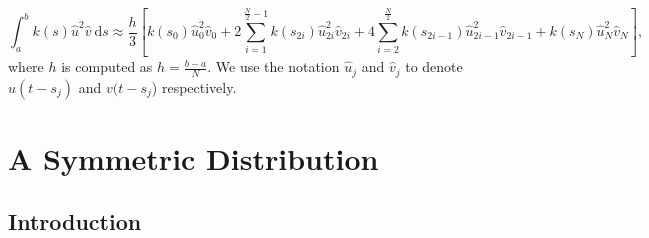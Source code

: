 \begin{equation}\label{simp}\int_{a}^{b}k(s)\hat{u}^2\hat{v}\  \text{d}s\approx\frac{h}{3}\left[k(s_0)\hat{u}^2_0\hat{v}_0+2\sum_{i=1}^{\frac{N}{2}-1}k(s_{2i})\hat{u}^2_{2i}\hat{v}_{2i}+4\sum_{i=2}^{\frac{N}{2}}k(s_{2i-1})\hat{u}^2_{2i-1}\hat{v}_{2i-1}+k(s_N)\hat{u}^2_N\hat{v}_N\right],
\end{equation}
where $h$ is computed as $h=\frac{b-a}{N}$. We use the notation $\hat{u}_j$ and $\hat{v}_j$ to denote $u(t-s_j)$ and $v(t-s_j$) respectively.

\section{A Symmetric Distribution}\label{section:symmetric}
\subsection{Introduction}

